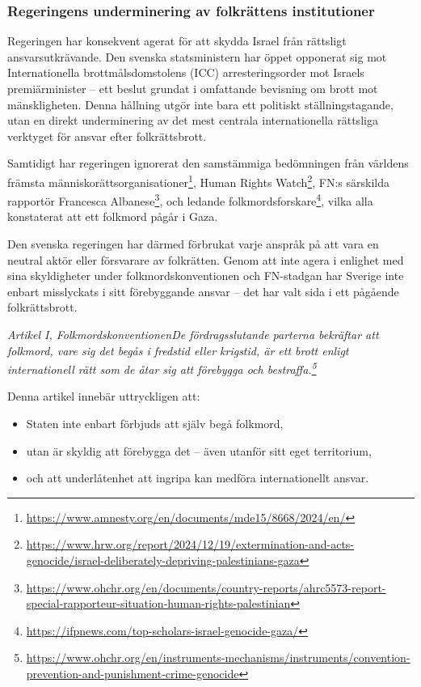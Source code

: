 \documentclass[12pt]{article}
\newcommand{\lagrum}[1]{\par\vspace{3mm}\textit{#1}\par\vspace{5mm}}
\begin{document}
\subsubsection*{Regeringens underminering av folkrättens institutioner}

Regeringen har konsekvent agerat för att skydda Israel från rättsligt ansvarsutkrävande. Den svenska statsministern har öppet opponerat sig mot Internationella brottmålsdomstolens (ICC) arresteringsorder mot Israels premiärminister – ett beslut grundat i omfattande bevisning om brott mot mänskligheten. Denna hållning utgör inte bara ett politiskt ställningstagande, utan en direkt underminering av det mest centrala internationella rättsliga verktyget för ansvar efter folkrättsbrott.

Samtidigt har regeringen ignorerat den samstämmiga bedömningen från världens främsta människorättsorganisationer\footnote{\url{https://www.amnesty.org/en/documents/mde15/8668/2024/en/}},  
Human Rights Watch\footnote{\url{https://www.hrw.org/report/2024/12/19/extermination-and-acts-genocide/israel-deliberately-depriving-palestinians-gaza}},  
FN:s särskilda rapportör Francesca Albanese\footnote{\url{https://www.ohchr.org/en/documents/country-reports/ahrc5573-report-special-rapporteur-situation-human-rights-palestinian}},  
och ledande folkmordsforskare\footnote{\url{https://ifpnews.com/top-scholars-israel-genocide-gaza/}},  
vilka alla konstaterat att ett folkmord pågår i Gaza. 

Den svenska regeringen har därmed förbrukat varje anspråk på att vara en neutral aktör eller försvarare av folkrätten. Genom att inte agera i enlighet med sina skyldigheter under folkmordskonventionen och FN-stadgan har Sverige inte enbart misslyckats i sitt förebyggande ansvar – det har valt sida i ett pågående folkrättsbrott.

\lagrum{Artikel I, Folkmordskonventionen\quad De fördragsslutande parterna bekräftar att folkmord, vare sig det begås i fredstid eller krigstid, är ett brott enligt internationell rätt som de åtar sig att förebygga och bestraffa.\footnote{\url{https://www.ohchr.org/en/instruments-mechanisms/instruments/convention-prevention-and-punishment-crime-genocide}}}

Denna artikel innebär uttryckligen att:
\begin{itemize}
  \item Staten inte enbart förbjuds att själv begå folkmord,
  \item utan är skyldig att förebygga det – även utanför sitt eget territorium,
  \item och att underlåtenhet att ingripa kan medföra internationellt ansvar.
\end{itemize}
\end{document}
